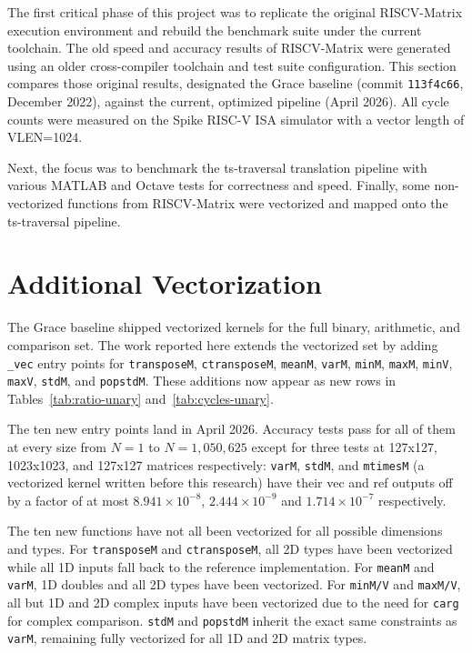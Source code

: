 

The first critical phase of this project was to replicate the original RISCV-Matrix execution environment and rebuild the benchmark suite under the current toolchain. The old speed and accuracy results of RISCV-Matrix were generated using an older cross-compiler toolchain and test suite configuration. This section compares those original results, designated the Grace baseline (commit \texttt{113f4c66}, December 2022), against the current, optimized pipeline (April 2026). All cycle counts were measured on the Spike RISC-V ISA simulator with a vector length of VLEN=1024.

Next, the focus was to benchmark the ts-traversal translation pipeline with various MATLAB and Octave tests for correctness and speed. Finally, some non-vectorized functions from RISCV-Matrix were vectorized and mapped onto the ts-traversal pipeline.

\section{Additional Vectorization}

The Grace baseline shipped vectorized kernels for the full binary, arithmetic, and comparison set. The work reported here extends the vectorized set by adding \texttt{\_vec} entry points for \texttt{transposeM}, \texttt{ctransposeM}, \texttt{meanM}, \texttt{varM}, \texttt{minM}, \texttt{maxM}, \texttt{minV}, \texttt{maxV}, \texttt{stdM}, and \texttt{popstdM}. These additions now appear as new rows in Tables~\ref{tab:ratio-unary} and~\ref{tab:cycles-unary}.

The ten new entry points land in April 2026. Accuracy tests pass for all of them at every size from $N=1$ to $N=1{,}050{,}625$ except for three tests at 127x127, 1023x1023, and 127x127 matrices respectively: \texttt{varM}, \texttt{stdM}, and \texttt{mtimesM} (a vectorized kernel written before this research) have their vec and ref outputs off by a factor of at most $8.941 \times 10^{-8}$, $2.444 \times 10^{-9}$ and $1.714 \times 10^{-7}$ respectively.

The ten new functions have not all been vectorized for all possible dimensions and types. For \texttt{transposeM} and \texttt{ctransposeM}, all 2D types have been vectorized while all 1D inputs fall back to the reference implementation. For \texttt{meanM} and \texttt{varM}, 1D doubles and all 2D types have been vectorized. 
For \texttt{minM/V} and \texttt{maxM/V}, all but 1D and 2D complex inputs have been vectorized due to the need for \texttt{carg} for complex comparison. \texttt{stdM} and \texttt{popstdM} inherit the exact same constraints as \texttt{varM}, remaining fully vectorized for all 1D and 2D matrix types.

